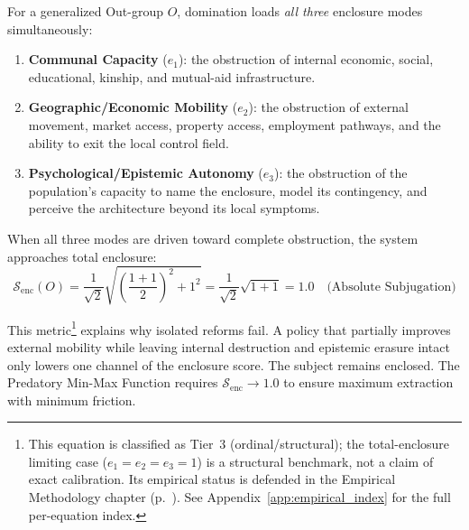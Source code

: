 For a generalized Out-group $O$, domination loads \textit{all three} enclosure
modes simultaneously:

\begin{enumerate}
    \item \textbf{Communal Capacity} ($e_1$): the obstruction of internal
    economic, social, educational, kinship, and mutual-aid infrastructure.

    \item \textbf{Geographic/Economic Mobility} ($e_2$): the obstruction of
    external movement, market access, property access, employment pathways, and
    the ability to exit the local control field.

    \item \textbf{Psychological/Epistemic Autonomy} ($e_3$): the obstruction of
    the population's capacity to name the enclosure, model its contingency, and
    perceive the architecture beyond its local symptoms.
\end{enumerate}

When all three modes are driven toward complete obstruction, the system
approaches total enclosure:
\begin{equation}\label{eq:1.2-total-enclosure}
\mathcal{S}_{\text{enc}}(O) = \frac{1}{\sqrt{2}}\sqrt{\left(\frac{1+1}{2}\right)^{\!2} + 1^{2}} = \frac{1}{\sqrt{2}}\sqrt{1 + 1} = 1.0 \quad \text{(Absolute Subjugation)}
\end{equation}

This metric\footnote{This equation is classified as Tier~3 (ordinal/structural); the total-enclosure limiting case ($e_1 = e_2 = e_3 = 1$) is a structural benchmark, not a claim of exact calibration. Its empirical status is defended in the Empirical Methodology chapter (p.~\pageref{ch:empirical_methodology}). See Appendix~\ref{app:empirical_index} for the full per-equation index.} explains why isolated reforms fail. A policy that partially improves external mobility while leaving internal destruction and epistemic erasure intact only lowers one channel of the enclosure score. The subject remains enclosed. The Predatory Min-Max Function requires $\mathcal{S}_{\text{enc}} \rightarrow 1.0$ to ensure maximum extraction with minimum friction.


